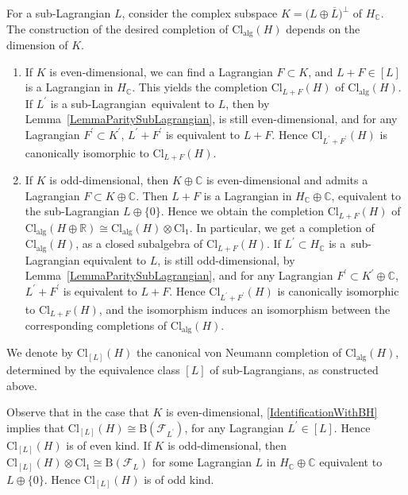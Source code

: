 \documentclass[10pt,a4paper]{amsart}
\numberwithin{equation}{section}
\newcommand{\R}{\mathbb{R}}
\newcommand{\C}{\mathbb{C}}
\newcommand{\B}{\mathrm{B}}
\newcommand{\Cl}{\mathrm{Cl}}
\begin{document}
For a sub-Lagrangian $L$, consider the complex subspace $K = \big(L \oplus \overline{L}\big)^\perp$ of $H_\C$.
The construction of the desired completion of $\Cl_{\mathrm{alg}}(H)$ depends on the dimension of $K$.
\begin{enumerate}\itemsep=0pt
\item[(i)] If $K$ is even-dimensional, we can find a Lagrangian $F \subset K$, and $L + F \in [L]$ is a Lagrangian in $H_\C$.
This yields the completion $\Cl_{L+F}(H)$ of $\Cl_{\mathrm{alg}}(H)$.
If $L^\prime$ is a sub-Lagrangian~equivalent to $L$, then by Lemma~\ref{LemmaParitySubLagrangian},  is still even-dimensional, and for any Lagrangian $F^\prime \subset K^\prime$, $L^\prime + F^\prime$ is equivalent to $L+F$.
Hence $\Cl_{L^\prime + F^\prime}(H)$ is canonically isomorphic to $\Cl_{L+F}(H)$.

\item[(ii)] If $K$ is odd-dimensional, then $K \oplus \C$ is even-dimensional and admits a Lagrangian $F \subset K \oplus \C$.
Then $L + F$ is a Lagrangian in $H_\C \oplus \C$, equivalent to the sub-Lagrangian $L \oplus \{0\}$.
Hence we obtain the completion $\Cl_{L+F}(H)$ of $\Cl_{\mathrm{alg}}(H \oplus \R) \cong \Cl_{\mathrm{alg}}(H) \otimes \Cl_1$.
In particular, we get a completion of $\Cl_{\mathrm{alg}}(H)$, as a closed subalgebra of $\Cl_{L+F}(H)$.
If $L^\prime \subset H_\C$ is a~sub-Lagrangian equivalent to $L$,  is still odd-dimensional, by Lemma~\ref{LemmaParitySubLagrangian}, and for any Lagrangian $F^\prime \subset K^\prime \oplus \C$, $L^\prime + F^\prime$ is equivalent to $L+F$.
Hence $\Cl_{L^\prime+F^\prime}(H)$ is canonically isomorphic to $\Cl_{L + F}(H)$, and the isomorphism induces an isomorphism between the corresponding completions of $\Cl_{\mathrm{alg}}(H)$.
\end{enumerate}

We denote by $\Cl_{[L]}(H)$ the canonical von Neumann completion of $\Cl_{\mathrm{alg}}(H)$, determined by the equivalence class $[L]$ of sub-Lagrangians, as constructed above.

Observe that in the case that $K$ is even-dimensional, \eqref{IdentificationWithBH} implies that $\Cl_{[L]}(H) \cong \B(\mathcal{F}_{L^\prime})$, for any Lagrangian $L^\prime \in [L]$.
Hence $\Cl_{[L]}(H)$ is of even kind.
If $K$ is odd-dimensional, then $\Cl_{[L]}(H) \otimes \Cl_1 \cong \B(\mathcal{F}_{L})$ for some Lagrangian $L$ in $H_\C \oplus \C$ equivalent to $L \oplus \{0\}$.
Hence $\Cl_{[L]}(H)$ is of odd kind.
\end{document}
